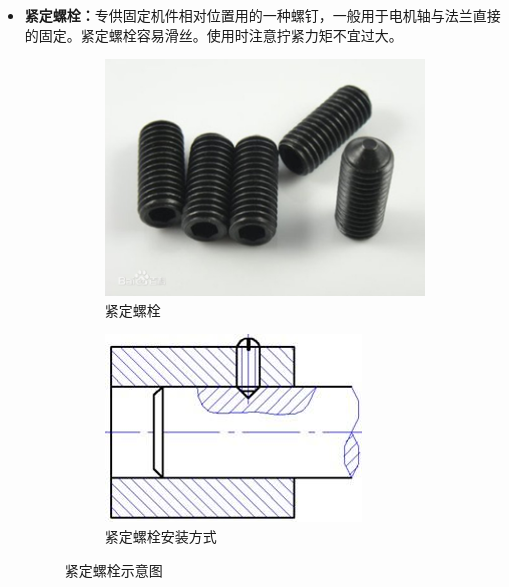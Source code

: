 \documentclass[UTF8]{article} %
\begin{document}
\begin{itemize}
	\item \textbf{紧定螺栓：}专供固定机件相对位置用的一种螺钉，一般用于电机轴与法兰直接的固定。紧定螺栓容易滑丝。使用时注意拧紧力矩不宜过大。

  \begin{figure}[H]
    \centering
    \begin{subfigure}[b]{0.39\textwidth}
           \centering
           \includegraphics[width=\textwidth]{luo2.png}
            \caption{紧定螺栓}
    \end{subfigure}
    \quad
    \begin{subfigure}[b]{0.4\textwidth}
            \centering
            \includegraphics[width=\textwidth]{luo22.png}
            \caption{紧定螺栓安装方式}
    \end{subfigure}
    \caption{紧定螺栓示意图}
  \end{figure}


\end{itemize}
\end{document}
